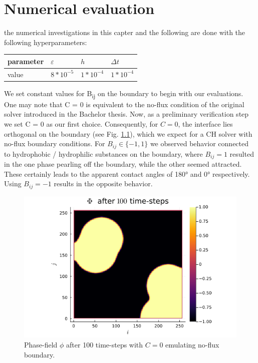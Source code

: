 \documentclass{mimosis}
\begin{document}
\chapter{Numerical evaluation}
\label{sec:org75922b4}
the numerical investigations in this capter and the following are done with the following hyperparameters:
\begin{center}
\begin{tabular}{llll}
parameter & \(\varepsilon\) & \(h\) & \(\Delta t\)\\
\hline
value & \(8 * 10^{-5}\) & \(1*10^{-4}\) & \(1*10^{-4}\)\\
\end{tabular}
\end{center}
We set constant values for B\textsubscript{ij} on the boundary to begin with our evaluations.
One may note that C = 0 is equivalent to the no-flux condition of the original solver introduced in the Bachelor thesis. Now, as a preliminary verification step we set C = 0 as our first choice.
Consequently, for \(C = 0\), the interface lies orthogonal on the boundary (see Fig. \ref{fig:angle0}), which we expect for a CH solver with no-flux boundary conditions.
For \(B_{ij} \in \{-1,1\}\) we observed behavior connected to hydrophobic / hydrophilic substances on the boundary, where \(B_{ij}=1\) resulted in the one phase pearling off the boundary, while the other seemed attracted. These certainly leads to the apparent contact angles of 180° and 0° respectively. Using \(B_{ij} = -1\) results in the opposite behavior.

\begin{figure}[htbp]
\centering
\includegraphics[width=.9\linewidth]{images/baseline.png}
\caption{\label{fig:angle0}Phase-field \(\phi\) after 100 time-steps with \(C=0\) emulating no-flux boundary.}
\end{figure}
\end{document}
